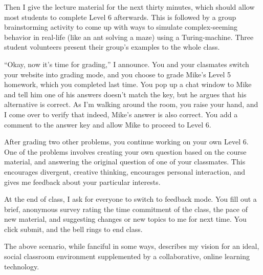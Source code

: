 \documentclass{article}
\begin{document}
Then I give the lecture material for the next thirty minutes, which
should allow most students to complete Level 6 afterwards. This is followed
by a group brainstorming activity to come up with ways to simulate complex-seeming
behavior in real-life (like an ant solving a maze) using a Turing-machine.
Three student volunteers present their group's examples to the whole class.

``Okay, now it’s time for grading,'' I announce.
You and your
clasmates switch your website
into grading mode, and you choose to grade Mike’s Level 5
homework, which you completed last time.
You pop up a chat window to Mike and
tell him one of his answers doesn't match the key, but he argues that his
alternative is correct.
As I’m walking around the room, you raise your hand, and I come
over to verify that indeed, Mike’s answer is also correct. You add a comment
to the answer key and allow Mike to proceed to Level 6.

After grading two other problems, you continue working on your own Level 6.
One of the problems involves creating your own question based on the course
material, and answering the original question of one of your classmates.
This encourages divergent, creative thinking, encourages personal interaction,
and gives me feedback about your particular interests.

At the end of class, I ask for everyone to switch to
feedback mode. You fill out a brief, anonymous survey
rating the time commitment of the class, the pace of new material, and suggesting
changes or new topics to me for next time.
You click submit, and the bell rings to end class.

The above scenario, while fanciful in some ways, describes my vision for an
ideal, social classroom environment supplemented by a
collaborative, online learning technology.
\end{document}
